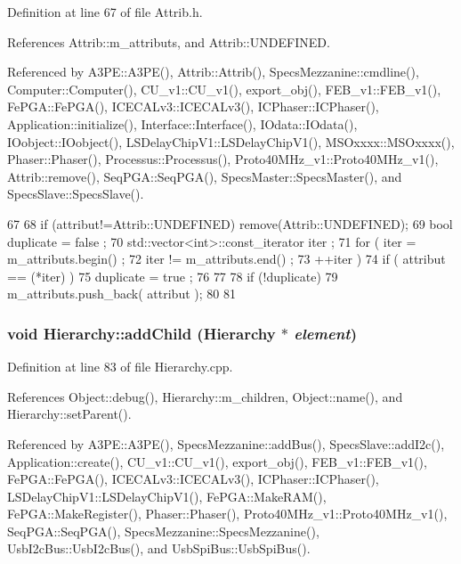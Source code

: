 Definition at line 67 of file Attrib.h.

References Attrib::m\_\-attributs, and Attrib::UNDEFINED.

Referenced by A3PE::A3PE(), Attrib::Attrib(), SpecsMezzanine::cmdline(), Computer::Computer(), CU\_\-v1::CU\_\-v1(), export\_\-obj(), FEB\_\-v1::FEB\_\-v1(), FePGA::FePGA(), ICECALv3::ICECALv3(), ICPhaser::ICPhaser(), Application::initialize(), Interface::Interface(), IOdata::IOdata(), IOobject::IOobject(), LSDelayChipV1::LSDelayChipV1(), MSOxxxx::MSOxxxx(), Phaser::Phaser(), Processus::Processus(), Proto40MHz\_\-v1::Proto40MHz\_\-v1(), Attrib::remove(), SeqPGA::SeqPGA(), SpecsMaster::SpecsMaster(), and SpecsSlave::SpecsSlave().


\begin{DoxyCode}
67                             {
68     if (attribut!=Attrib::UNDEFINED) remove(Attrib::UNDEFINED);
69     bool duplicate = false ;
70     std::vector<int>::const_iterator iter ;
71     for ( iter  = m_attributs.begin() ;
72           iter != m_attributs.end()   ;
73           ++iter ) {
74       if ( attribut == (*iter) ) {
75         duplicate = true ;
76       }
77     }
78     if (!duplicate) {
79       m_attributs.push_back( attribut );
80     }
81   }
\end{DoxyCode}
\hypertarget{classHierarchy_ad677774ff38fcb257c04a3a10d471fac}{
\subsubsection[{addChild}]{\setlength{\rightskip}{0pt plus 5cm}void Hierarchy::addChild ({\bf Hierarchy} $\ast$ {\em element})}}
\label{classHierarchy_ad677774ff38fcb257c04a3a10d471fac}


Definition at line 83 of file Hierarchy.cpp.

References Object::debug(), Hierarchy::m\_\-children, Object::name(), and Hierarchy::setParent().

Referenced by A3PE::A3PE(), SpecsMezzanine::addBus(), SpecsSlave::addI2c(), Application::create(), CU\_\-v1::CU\_\-v1(), export\_\-obj(), FEB\_\-v1::FEB\_\-v1(), FePGA::FePGA(), ICECALv3::ICECALv3(), ICPhaser::ICPhaser(), LSDelayChipV1::LSDelayChipV1(), FePGA::MakeRAM(), FePGA::MakeRegister(), Phaser::Phaser(), Proto40MHz\_\-v1::Proto40MHz\_\-v1(), SeqPGA::SeqPGA(), SpecsMezzanine::SpecsMezzanine(), UsbI2cBus::UsbI2cBus(), and UsbSpiBus::UsbSpiBus().


